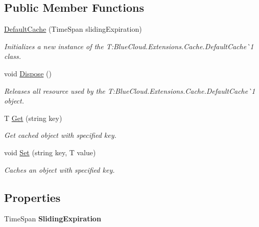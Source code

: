 \subsection*{Public Member Functions}
\begin{DoxyCompactItemize}
\item 
\mbox{\hyperlink{class_blue_cloud_1_1_extensions_1_1_cache_1_1_default_cache_a14fec20f91a78d445887fab2f59cfc7c}{Default\+Cache}} (Time\+Span sliding\+Expiration)
\begin{DoxyCompactList}\small\item\em Initializes a new instance of the T\+:\+Blue\+Cloud.\+Extensions.\+Cache.\+Default\+Cache\`{}1 class. \end{DoxyCompactList}\item 
void \mbox{\hyperlink{class_blue_cloud_1_1_extensions_1_1_cache_1_1_default_cache_a4ce78dfa582354a24038b9e94bdd750f}{Dispose}} ()
\begin{DoxyCompactList}\small\item\em Releases all resource used by the T\+:\+Blue\+Cloud.\+Extensions.\+Cache.\+Default\+Cache\`{}1 object. \end{DoxyCompactList}\item 
T \mbox{\hyperlink{class_blue_cloud_1_1_extensions_1_1_cache_1_1_default_cache_a93bb4ec6f9ec285c1d13a9f44ed3e48f}{Get}} (string key)
\begin{DoxyCompactList}\small\item\em Get cached object with specified key. \end{DoxyCompactList}\item 
void \mbox{\hyperlink{class_blue_cloud_1_1_extensions_1_1_cache_1_1_default_cache_a516484e43036468f7258451139938798}{Set}} (string key, T value)
\begin{DoxyCompactList}\small\item\em Caches an object with specified key. \end{DoxyCompactList}\end{DoxyCompactItemize}
\subsection*{Properties}
\begin{DoxyCompactItemize}
\item 
\mbox{\label{class_blue_cloud_1_1_extensions_1_1_cache_1_1_default_cache_ab3a9a9c08e2dcb3f621b0a6e26a7e56d}} 
Time\+Span {\bfseries Sliding\+Expiration}
\end{DoxyCompactItemize}


